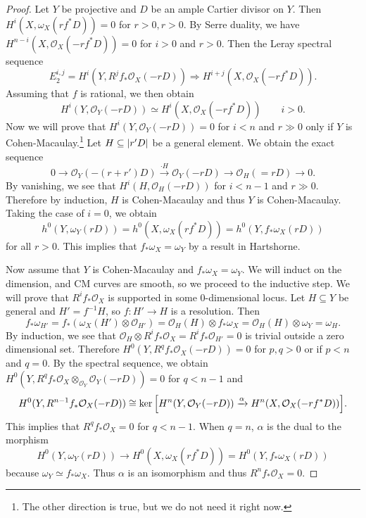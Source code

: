 \documentclass[leqno, openany]{memoir}
\theoremstyle{definition}
\theoremstyle{remark}
\theoremstyle{plain}
\theoremstyle{definition}
\theoremstyle{remark}
\newcommand{\mc}[1]{\mathcal{#1}}
\begin{document}
\begin{proof}
    Let $Y$ be projective and $D$ be an ample Cartier divisor on $Y$. Then $H^i(X, \omega_X(rf^* D)) = 0$ for $r > 0, r > 0$. By Serre duality, we have $H^{n-i}(X, \mc{O}_X(-rf^* D)) = 0$ for $i > 0$ and $r > 0$. Then the Leray spectral sequence
    \[ E_2^{i,j} = H^i(Y, R^j f_* \mc{O}_X(-rD)) \Rightarrow H^{i+j}(X, \mc{O}_X(-rf^* D)). \]
    Assuming that $f$ is rational, we then obtain
    \[ H^i(Y, \mc{O}_Y(-rD)) \simeq H^i(X, \mc{O}_X(-rf^* D)) \qquad i > 0. \]
    Now we will prove that $H^i(Y, \mc{O}_Y(-rD)) = 0$ for $i < n$ and $r \gg 0$ only if $Y$ is Cohen-Macaulay.\footnote{The other direction is true, but we do not need it right now.} Let $H \subseteq \abs{r'D}$ be a general element. We obtain the exact sequence
    \[ 0 \to \mc{O}_Y(-(r+r')D) \xrightarrow{\cdot H} \mc{O}_Y(-rD) \to \mc{O}_H(=rD) \to 0. \]
    By vanishing, we see that $H^i(H, \mc{O}_H(-rD))$ for $i < n-1$ and $r \gg 0$. Therefore by induction, $H$ is Cohen-Macaulay and thus $Y$ is Cohen-Macaulay. Taking the case of $i = 0$, we obtain
    \[ h^0(Y, \omega_Y(rD)) = h^0(X, \omega_X(rf^*D)) = h^0(Y, f_* \omega_X(rD)) \]
    for all $r > 0$. This implies that $f_* \omega_X = \omega_Y$ by a result in Hartshorne.

    Now assume that $Y$ is Cohen-Macaulay and $f_* \omega_X = \omega_Y$. We will induct on the dimension, and CM curves are smooth, so we proceed to the inductive step. We will prove that $R^i f_* \mc{O}_X$ is supported in some $0$-dimensional locus. Let $H \subseteq Y$ be general and $H' = f^{-1}H$, so $f \colon H' \to H$ is a resolution. Then 
    \[ f_* \omega_{H'} = f_* (\omega_X(H') \otimes \mc{O}_{H'}) = \mc{O}_H(H) \otimes f_* \omega_X = \mc{O}_H(H) \otimes \omega_Y = \omega_H. \]
    By induction, we see that $\mc{O}_H \otimes R^i f_* \mc{O}_X = R^i f_* \mc{O}_{H'} = 0$ is trivial outside a zero dimensional set. Therefore $H^0(Y, R^q f_* \mc{O}_X(-rD)) = 0$ for $p,q > 0$ or if $p<n$ and $q=0$. By the spectral sequence, we obtain $H^0(Y, R^q f_* \mc{O}_X \otimes_{\mc{O}_Y} \mc{O}_Y(-rD)) = 0$ for $q < n-1$ and
    \[ H^0(Y, R^{n-1}f_* \mc{O}_X(-rD)) \cong \ker \qty[ H^n(Y, \mc{O}_Y(-rD)) \xrightarrow{\alpha} H^n(X, \mc{O}_X(-rf^* D)) ]. \]
    This implies that $R^q f_* \mc{O}_X = 0$ for $q < n-1$. When $q = n$, $\alpha$ is the dual to the morphism
    \[ H^0(Y, \omega_Y(rD)) \to H^0(X, \omega_X(rf^*D)) = H^0(Y, f_* \omega_X(rD)) \]
    because $\omega_Y \simeq f_* \omega_X$. Thus $\alpha$ is an isomorphism and thus $R^n f_* \mc{O}_X = 0$.
\end{proof}
\end{document}
